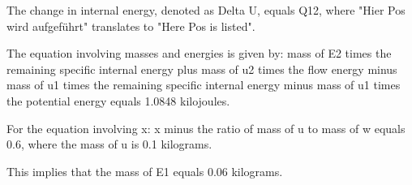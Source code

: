The change in internal energy, denoted as Delta U, equals Q12, where "Hier Pos wird aufgeführt" translates to "Here Pos is listed".

The equation involving masses and energies is given by:
mass of E2 times the remaining specific internal energy plus mass of u2 times the flow energy minus mass of u1 times the remaining specific internal energy minus mass of u1 times the potential energy equals 1.0848 kilojoules.

For the equation involving x:
x minus the ratio of mass of u to mass of w equals 0.6, where the mass of u is 0.1 kilograms.

This implies that the mass of E1 equals 0.06 kilograms.